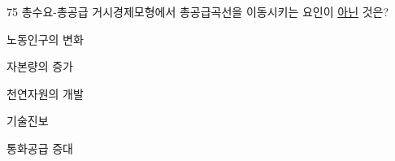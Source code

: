 \begin{question}{75}
총수요-총공급 거시경제모형에서 총공급곡선을 이동시키는 요인이 \uline{아닌} 것은?
\begin{choices}
  \item 노동인구의 변화
  \item 자본량의 증가
  \item 천연자원의 개발
  \item 기술진보
  \item 통화공급 증대
\end{choices}
\end{question}
